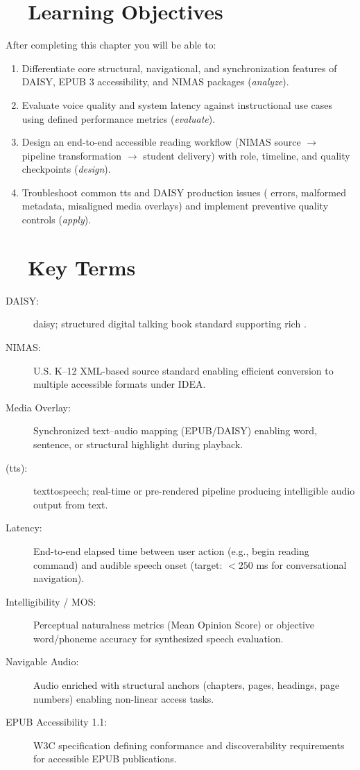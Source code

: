\section{~~Learning Objectives}\label{ch07:sec:learning-objectives}
After completing this chapter you will be able to:
\begin{enumerate}
	\item Differentiate core structural, navigational, and synchronization features of DAISY, EPUB 3
	      accessibility, and NIMAS packages (\emph{analyze}).
	\item Evaluate  voice quality and system latency against instructional use cases
	      using defined performance metrics (\emph{evaluate}).
	\item Design an end-to-end accessible reading workflow (NIMAS source $\rightarrow$ pipeline
	      transformation $\rightarrow$ student delivery) with role, timeline, and quality checkpoints
	      (\emph{design}).
	\item Troubleshoot common \gls{tts} and DAISY production issues ( errors, malformed metadata,
	      misaligned media overlays) and implement preventive quality controls (\emph{apply}).
\end{enumerate}

\section{~~Key Terms}\label{ch07:sec:key-terms}
\begin{description}
	\item[DAISY:] \gls{daisy}; structured digital talking book standard supporting rich .
	\item[NIMAS:] U.S. K–12 XML-based source standard enabling efficient conversion to multiple
	      accessible formats under IDEA\supercite{IDEA2004}.
	\item[Media Overlay:] Synchronized text–audio mapping (EPUB/DAISY) enabling word, sentence, or
	      structural highlight during playback\supercite{W3CMediaA11y}.
	\item[ (\gls{tts}):] \gls{texttospeech}; real-time or pre-rendered 
	      pipeline producing intelligible audio output from text.
	\item[Latency:] End-to-end elapsed time between user action (e.g., begin reading command) and
	      audible speech onset (target: $< 250$ ms for conversational navigation).
	\item[Intelligibility / MOS:] Perceptual naturalness metrics (Mean Opinion Score) or objective
	      word/phoneme accuracy for synthesized speech evaluation.
	\item[Navigable Audio:] Audio enriched with structural anchors (chapters, pages, headings,
	      page numbers) enabling non-linear access tasks.
	\item[EPUB Accessibility 1.1:] W3C specification defining conformance and discoverability
	      requirements for accessible EPUB publications.
\end{description}

